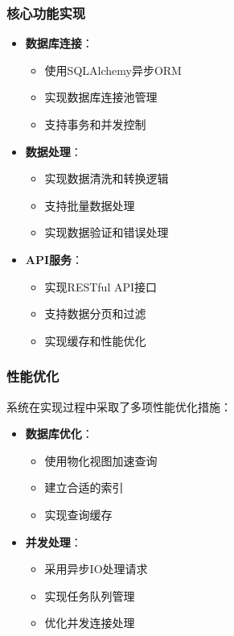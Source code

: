 \subsubsection{核心功能实现}
\begin{itemize}
    \item \textbf{数据库连接}：
    \begin{itemize}
        \item 使用SQLAlchemy异步ORM
        \item 实现数据库连接池管理
        \item 支持事务和并发控制
    \end{itemize}
    
    \item \textbf{数据处理}：
    \begin{itemize}
        \item 实现数据清洗和转换逻辑
        \item 支持批量数据处理
        \item 实现数据验证和错误处理
    \end{itemize}
    
    \item \textbf{API服务}：
    \begin{itemize}
        \item 实现RESTful API接口
        \item 支持数据分页和过滤
        \item 实现缓存和性能优化
    \end{itemize}
\end{itemize}

\subsubsection{性能优化}
系统在实现过程中采取了多项性能优化措施：
\begin{itemize}
    \item \textbf{数据库优化}：
    \begin{itemize}
        \item 使用物化视图加速查询
        \item 建立合适的索引
        \item 实现查询缓存
    \end{itemize}
    
    \item \textbf{并发处理}：
    \begin{itemize}
        \item 采用异步IO处理请求
        \item 实现任务队列管理
        \item 优化并发连接处理
    \end{itemize}
\end{itemize}

